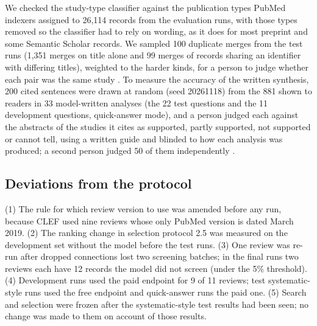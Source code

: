 We checked the study-type classifier against the publication types PubMed indexers assigned to 26,114 records from
the evaluation runs, with those types removed so the classifier had to rely on wording, as it does for most
preprint and some Semantic Scholar records. We sampled 100 duplicate merges from the test runs (1,351 merges on title
alone and 99 merges of records sharing an identifier with differing titles), weighted to the harder kinds, for a
person to judge whether each pair was the same study . To measure the accuracy of the
written synthesis, 200 cited sentences were drawn at random (seed 20261118) from the 881 shown to readers in 33
model-written analyses (the 22 test questions and the 11 development questions, quick-answer mode), and a person
judged each against the abstracts of the studies it cites as supported, partly supported, not supported or cannot
tell, using a written guide and blinded to how each analysis was produced; a second person judged 50 of them
independently .

\subsection{Deviations from the protocol}

(1) The rule for which review version to use was amended before any run, because CLEF used nine reviews whose only
PubMed version is dated March 2019. (2) The ranking change in selection protocol 2.5 was measured on the
development set without the model before the test runs. (3) One review was re-run after dropped connections lost
two screening batches; in the final runs two reviews each have 12 records the model did not screen (under the 5\%
threshold). (4) Development runs used the paid endpoint for 9 of 11 reviews; test systematic-style runs used the
free endpoint and quick-answer runs the paid one. (5) Search and selection were frozen after the systematic-style
test results had been seen; no change was made to them on account of those results.
